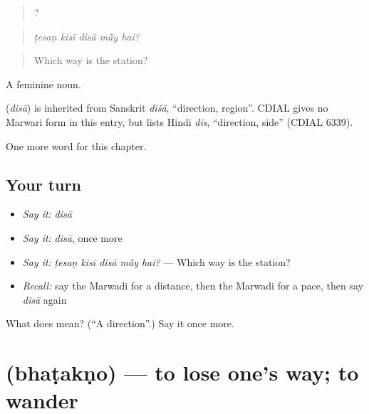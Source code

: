 \begin{quote}
    ?
\end{quote}

\begin{quote}
\emph{ṭesaṇ kisī disā mā̃y hai?}
\end{quote}

\begin{quote}
Which way is the station?
\end{quote}

A feminine noun.

\begin{cousinweb}
\textbf{} (\emph{disā}) is inherited from Sanskrit \emph{diśā}, \textquotedblleft{}direction, region\textquotedblright{}. CDIAL gives no Marwari form in this entry, but lists Hindi \emph{dis}, \textquotedblleft{}direction, side\textquotedblright{} (CDIAL 6339).
\end{cousinweb}

\begin{grammarlens}[title={What you've built}]
One more word for this chapter.
\end{grammarlens}

\subsection*{Your turn}
\begin{itemize}
\raggedright
  \item \emph{Say it:} \emph{disā}
  \item \emph{Say it:} \emph{disā}, once more
  \item \emph{Say it:} \emph{ṭesaṇ kisī disā mā̃y hai?} — Which way is the station?
  \item \emph{Recall:} say the Marwadi for a distance, then the Marwadi for a pace, then say \emph{disā} again
\end{itemize}

\begin{tcolorbox}[breakable,colback=teal!4,colframe=teal!35!black,title={Before you move on}]
What does  mean? (\textquotedblleft{}A direction\textquotedblright{}.) Say it once more.
\end{tcolorbox}
\section[\texorpdfstring{\mw{भटकणो} (bhaṭakṇo)}{भटकणो (bhaṭakṇo)}]{ (bhaṭakṇo) — to lose one's way; to wander}

